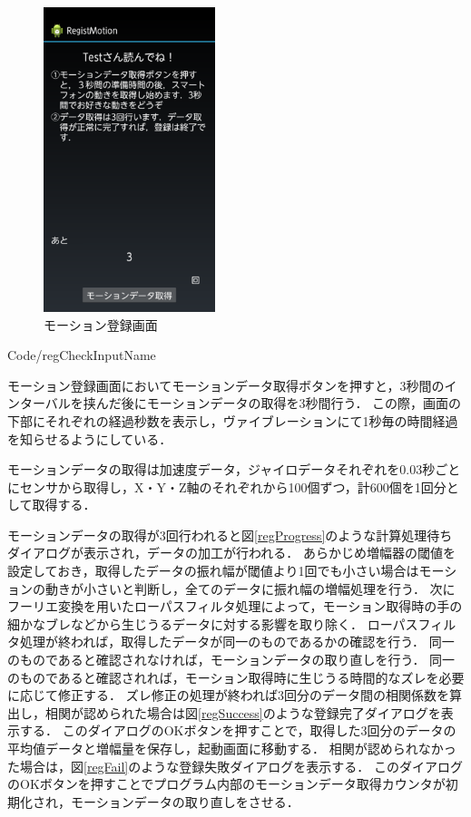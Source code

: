 \documentclass[11pt]{jreport}
\renewcommand{\slash}{/}
\begin{document}
\begin{figure}[tbhp]
            \begin{minipage}{0.33\hsize}
                \begin{center}
                    \includegraphics[width=5cm, bb=0 0 540 960]{Reg.pdf}
                \end{center}
                \caption{モーション登録画面}
                \label{reg}
            \end{minipage}
        \end{figure}

        
        {Code\slash regCheckInputName}

        モーション登録画面においてモーションデータ取得ボタンを押すと，3秒間のインターバルを挟んだ後にモーションデータの取得を3秒間行う．
        この際，画面の下部にそれぞれの経過秒数を表示し，ヴァイブレーションにて1秒毎の時間経過を知らせるようにしている．

        モーションデータの取得は加速度データ，ジャイロデータそれぞれを0.03秒ごとにセンサから取得し，X・Y・Z軸のそれぞれから100個ずつ，計600個を1回分として取得する．

        モーションデータの取得が3回行われると図\ref{regProgress}のような計算処理待ちダイアログが表示され，データの加工が行われる．
        あらかじめ増幅器の閾値を設定しておき，取得したデータの振れ幅が閾値より1回でも小さい場合はモーションの動きが小さいと判断し，全てのデータに振れ幅の増幅処理を行う．
        次にフーリエ変換を用いたローパスフィルタ処理によって，モーション取得時の手の細かなブレなどから生じうるデータに対する影響を取り除く．
        ローパスフィルタ処理が終われば，取得したデータが同一のものであるかの確認を行う．
        同一のものであると確認されなければ，モーションデータの取り直しを行う．
        同一のものであると確認されれば，モーション取得時に生じうる時間的なズレを必要に応じて修正する．
        ズレ修正の処理が終われば3回分のデータ間の相関係数を算出し，相関が認められた場合は図\ref{regSuccess}のような登録完了ダイアログを表示する．
        このダイアログのOKボタンを押すことで，取得した3回分のデータの平均値データと増幅量を保存し，起動画面に移動する．
        相関が認められなかった場合は，図\ref{regFail}のような登録失敗ダイアログを表示する．
        このダイアログのOKボタンを押すことでプログラム内部のモーションデータ取得カウンタが初期化され，モーションデータの取り直しをさせる．
\end{document}

